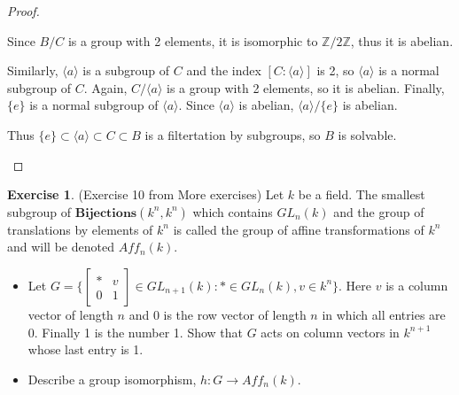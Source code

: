 \documentclass[12pt, psamsfonts]{amsart}
\theoremstyle{definition}
\newtheorem*{exer}{Exercise}
\theoremstyle{remark}
\numberwithin{equation}{section}
\begin{document}
\begin{proof}
\begin{itemize}
      Since $B / C$ is a group with 2 elements, it is isomorphic to $\mathbb{Z}/2\mathbb{Z}$, thus it is abelian.

      Similarly, $\langle a \rangle$ is a subgroup of $C$ and the index $[C:\langle a \rangle]$ is 2, so $\langle a \rangle$ is a normal subgroup of $C$.
      Again, $C / \langle a \rangle$ is a group with 2 elements, so it is abelian.
      Finally, $\{ e \}$ is a normal subgroup of $\langle a \rangle$.
      Since $\langle a \rangle$ is abelian, $\langle a \rangle / \{ e \}$ is abelian.

      Thus $\{ e \} \subset \langle a \rangle \subset C \subset B$ is a filtertation by subgroups, so $B$ is solvable.
  \end{itemize}
\end{proof}

\begin{exer}{(Exercise 10 from More exercises)}
  Let $k$ be a field.
  The smallest subgroup of $\textbf{Bijections}(k^n, k^n)$ which contains $GL_n(k)$ and the group of translations by elements of $k^n$ is called the group of affine transformations of $k^n$ and will be denoted $Aff_n(k)$.
  \begin{itemize}
    \item
      Let $G = \{ \begin{bmatrix} * & v \\ 0 & 1 \end{bmatrix} \in GL_{n + 1}(k): * \in GL_n(k), v \in k^n \}$.
      Here $v$ is a column vector of length $n$ and $0$ is the row vector of length $n$ in which all entries are 0.
      Finally 1 is the number 1.
      Show that $G$ acts on column vectors in $k^{n + 1}$ whose last entry is 1.
    \item
      Describe a group isomorphism, $h: G \rightarrow Aff_n(k)$.
  \end{itemize}
\end{exer}
\end{document}
